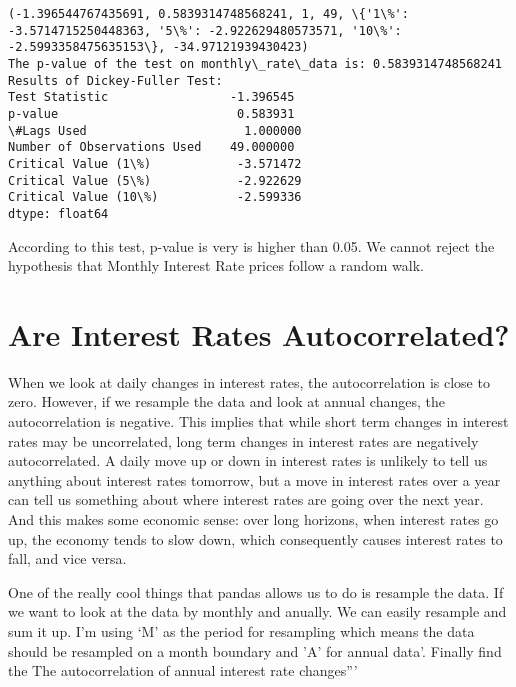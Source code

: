 \documentclass[11pt]{article}
\begin{document}
    \begin{Verbatim}[commandchars=\\\{\}]
(-1.396544767435691, 0.5839314748568241, 1, 49, \{'1\%': -3.5714715250448363, '5\%': -2.922629480573571, '10\%': -2.5993358475635153\}, -34.97121939430423)
The p-value of the test on monthly\_rate\_data is: 0.5839314748568241
Results of Dickey-Fuller Test:
Test Statistic                 -1.396545
p-value                         0.583931
\#Lags Used                      1.000000
Number of Observations Used    49.000000
Critical Value (1\%)            -3.571472
Critical Value (5\%)            -2.922629
Critical Value (10\%)           -2.599336
dtype: float64

    \end{Verbatim}

    According to this test, p-value is very is higher than 0.05. We cannot
reject the hypothesis that Monthly Interest Rate prices follow a random
walk.

    \section{Are Interest Rates
Autocorrelated?}\label{are-interest-rates-autocorrelated}

When we look at daily changes in interest rates, the autocorrelation is
close to zero. However, if we resample the data and look at annual
changes, the autocorrelation is negative. This implies that while short
term changes in interest rates may be uncorrelated, long term changes in
interest rates are negatively autocorrelated. A daily move up or down in
interest rates is unlikely to tell us anything about interest rates
tomorrow, but a move in interest rates over a year can tell us something
about where interest rates are going over the next year. And this makes
some economic sense: over long horizons, when interest rates go up, the
economy tends to slow down, which consequently causes interest rates to
fall, and vice versa.

One of the really cool things that pandas allows us to do is resample
the data. If we want to look at the data by monthly and anually. We can
easily resample and sum it up. I'm using `M' as the period for
resampling which means the data should be resampled on a month boundary
and 'A' for annual data'. Finally find the The autocorrelation of annual
interest rate changes'''
\end{document}
